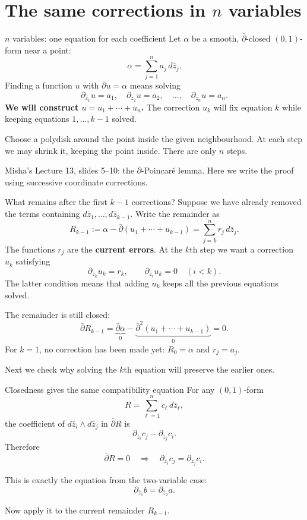 \documentclass[aspectratio=169,11pt]{beamer}
\newcommand{\db}{\bar\partial}
\newcommand{\src}[1]{\par\vfill{\scriptsize #1\par}}
\begin{document}
\section{The same corrections in \texorpdfstring{$n$}{n} variables}

\begin{frame}{$n$ variables: one equation for each coefficient}
Let $\alpha$ be a smooth, $\db$-closed $(0,1)$-form near a point:
\[
 \alpha=\sum_{j=1}^n a_j\,d\bar z_j.
\]
Finding a function $u$ with $\db u=\alpha$ means solving
\[
 \partial_{\bar z_1}u=a_1,\quad
 \partial_{\bar z_2}u=a_2,\quad\ldots,\quad
 \partial_{\bar z_n}u=a_n.
\]
\textbf{We will construct $u=u_1+\cdots+u_n$.}
The correction $u_k$ will fix equation $k$ while keeping equations
$1,\ldots,k-1$ solved.

Choose a polydisk around the point inside the given neighbourhood.
At each step we may shrink it, keeping the point inside.
There are only $n$ steps.
\src{Misha's Lecture 13, slides 5--10: the $\db$-Poincar\'e lemma.
Here we write the proof using successive coordinate corrections.}
\end{frame}

\begin{frame}{What remains after the first $k-1$ corrections?}
Suppose we have already removed the terms containing
$d\bar z_1,\ldots,d\bar z_{k-1}$. Write the remainder as
\[
 R_{k-1}
 :=\alpha-\db(u_1+\cdots+u_{k-1})
 =\sum_{j=k}^n r_j\,d\bar z_j.
\]
The functions $r_j$ are the \textbf{current errors}.
At the $k$th step we want a correction $u_k$ satisfying
\[
 \partial_{\bar z_k}u_k=r_k,
 \qquad
 \partial_{\bar z_i}u_k=0\quad(i<k).
\]
The latter condition means that adding $u_k$ keeps all the previous
equations solved.

The remainder is still closed:
\[
 \db R_{k-1}
 =\underbrace{\db\alpha}_{0}
  -\underbrace{\db^2(u_1+\cdots+u_{k-1})}_{0}=0.
\]
For $k=1$, no correction has been made yet:
$R_0=\alpha$ and $r_j=a_j$.

Next we check why solving the $k$th equation will preserve the earlier ones.
\end{frame}

\begin{frame}{Closedness gives the same compatibility equation}
For any $(0,1)$-form
\[
 R=\sum_{\ell=1}^n c_\ell\,d\bar z_\ell,
\]
the coefficient of $d\bar z_i\wedge d\bar z_j$ in $\db R$ is
\[
 \partial_{\bar z_i}c_j-\partial_{\bar z_j}c_i.
\]
Therefore
\[
 \db R=0
 \quad\Longrightarrow\quad
 \boxed{\partial_{\bar z_i}c_j
 =\partial_{\bar z_j}c_i.}
\]

This is exactly the equation from the two-variable case:
\[
 \partial_{\bar z_1}b=\partial_{\bar z_2}a.
\]

Now apply it to the current remainder $R_{k-1}$.
\end{frame}
\end{document}
